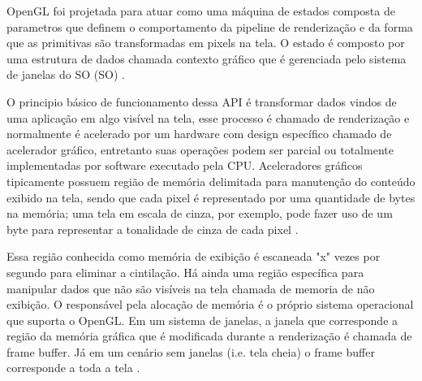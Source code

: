 OpenGL foi projetada para atuar como uma máquina de estados composta de parametros que definem o comportamento da pipeline de renderização e da forma que as primitivas são transformadas em pixels na tela. O estado é composto por uma estrutura de dados chamada contexto gráfico que é gerenciada pelo sistema de janelas do SO (\acrlong{SO}) \cite{GLSLBook}. 

O principio básico de funcionamento dessa API é transformar dados vindos de uma aplicação em algo visível na tela, esse processo é chamado de renderização e normalmente é acelerado por um hardware com design específico chamado de acelerador gráfico, entretanto suas operações podem ser parcial ou totalmente implementadas por software executado pela CPU. Aceleradores gráficos tipicamente possuem região de memória delimitada para manutenção do conteúdo exibido na tela, sendo que cada pixel é representado por uma quantidade de bytes na memória; uma tela em escala de cinza, por exemplo, pode fazer uso de um byte para representar a tonalidade de cinza de cada pixel \cite{GLSLBook}.

Essa região conhecida como memória de exibição é escaneada "x" vezes por segundo para eliminar a cintilação. Há ainda uma região específica para manipular dados que não são visíveis na tela chamada de memoria de não exibição. O responsável pela alocação de memória é o próprio sistema operacional que suporta o OpenGL. Em um sistema de janelas, a janela que corresponde a região da memória gráfica que é modificada durante a renderização é chamada de frame buffer. Já em um cenário sem janelas (i.e. tela cheia) o frame buffer corresponde a toda a tela \cite{GLSLBook}.

\begin{figure}[h!]
	\centering
\end{figure}
\nocite{dptbuf}

